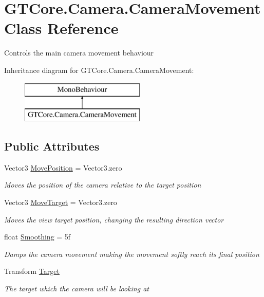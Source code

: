 \hypertarget{class_g_t_core_1_1_camera_1_1_camera_movement}{}\section{G\+T\+Core.\+Camera.\+Camera\+Movement Class Reference}
\label{class_g_t_core_1_1_camera_1_1_camera_movement}


Controls the main camera movement behaviour  


Inheritance diagram for G\+T\+Core.\+Camera.\+Camera\+Movement\+:\begin{figure}[H]
\begin{center}
\leavevmode
\includegraphics[height=2.000000cm]{class_g_t_core_1_1_camera_1_1_camera_movement}
\end{center}
\end{figure}
\subsection*{Public Attributes}
\begin{DoxyCompactItemize}
\item 
Vector3 \hyperlink{class_g_t_core_1_1_camera_1_1_camera_movement_a41c414edba414aada8b4a60a81dfe645}{Move\+Position} = Vector3.\+zero
\begin{DoxyCompactList}\small\item\em Moves the position of the camera relative to the target position \end{DoxyCompactList}\item 
Vector3 \hyperlink{class_g_t_core_1_1_camera_1_1_camera_movement_a6e6ee6e6693f79f8280cbd3a00787f01}{Move\+Target} = Vector3.\+zero
\begin{DoxyCompactList}\small\item\em Moves the view target position, changing the resulting direction vector \end{DoxyCompactList}\item 
float \hyperlink{class_g_t_core_1_1_camera_1_1_camera_movement_a65a4a371001a930368dc17f51c6f7b77}{Smoothing} = 5f
\begin{DoxyCompactList}\small\item\em Damps the camera movement making the movement softly reach its final position \end{DoxyCompactList}\item 
Transform \hyperlink{class_g_t_core_1_1_camera_1_1_camera_movement_a90c325f21f94e65dc0347a239bce2147}{Target}
\begin{DoxyCompactList}\small\item\em The target which the camera will be looking at \end{DoxyCompactList}\end{DoxyCompactItemize}
